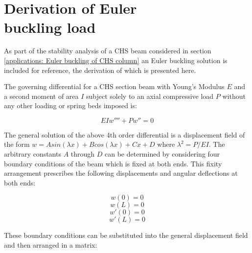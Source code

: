 \chapter[Derivation of Euler buckling load]{Derivation of Euler\\ buckling load}
\label{app:Derivation of Euler buckling load}
\renewcommand{\Thema}{Derivation of Euler buckling load}

As part of the stability analysis of a CHS beam considered in section \ref{applications: Euler buckling of CHS column} an Euler buckling solution is included for reference, the derivation of which is presented here.

The governing differential for a CHS section beam with Young's Modulus $E$  and a second moment of area $I$ subject solely to an axial compressive load $P$ without any other loading or spring beds imposed is:

\begin{equation} 
EI w'''' + Pw'' = 0
\label{eqapp4_1}
\end{equation}

The general solution of the above 4th order differential is a displacement field of the form $w = Asin(\lambda x) + Bcos(\lambda x) +  Cx + D$ where $\lambda^2 = P/EI$. The arbitrary constants $A$ through $D$ can be determined by considering four boundary conditions of the beam which is fixed at both ends. This fixity arrangement prescribes the following displacements and angular deflections at both ends:

\begin{equation} 
w(0) = 0
\label{eqapp4_2}
\end{equation}
\begin{equation} 
w(L) = 0
\label{eqapp4_3}
\end{equation}
\begin{equation} 
w'(0) = 0
\label{eqapp4_4}
\end{equation}
\begin{equation} 
w'(L) = 0
\label{eqapp4_5}
\end{equation}

These boundary conditions can be substituted into the general displacement field and then arranged in a matrix:

